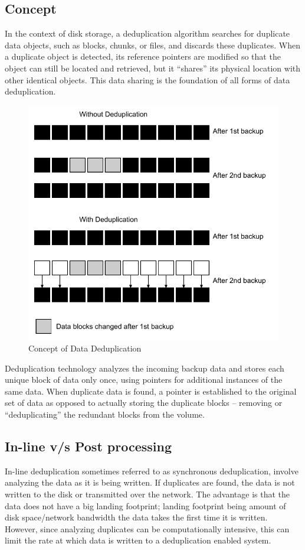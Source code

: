 \documentclass[final]{ols}
\begin{document}
\subsection{Concept}
In the context of disk storage, a deduplication algorithm searches for duplicate
 data objects, such as blocks, chunks, or files, and discards these duplicates.
 When a duplicate object is detected, its reference pointers are modified so 
that the object can still be located and retrieved, but it ``shares'' its physical 
location with other identical objects. This data sharing is the foundation of all forms of data deduplication. 
\begin{figure}[H]
\begin{center}
\includegraphics[width=1\columnwidth]{images/concept_dedup}
\caption{Concept of Data Deduplication}  
\end{center}
\end{figure}
Deduplication technology analyzes the incoming backup data and stores each unique block of data only once, using pointers for additional instances of the same data. When duplicate data is found, a pointer is established to the original set of data as opposed to actually storing the duplicate blocks --  removing or ``deduplicating'' the redundant blocks from the volume.

\subsection{In-line v/s Post processing}
In-line deduplication sometimes referred to as synchronous deduplication,  involve analyzing the data as it is being written. If duplicates are found, the data is not written to the disk or transmitted over the network. The advantage is that the data does not have a big landing footprint; landing footprint being amount of disk space/network bandwidth the data takes the first time it is written. However, since analyzing duplicates can be computationally intensive, this can limit the rate at which data is written to a deduplication enabled system.
\end{document}
